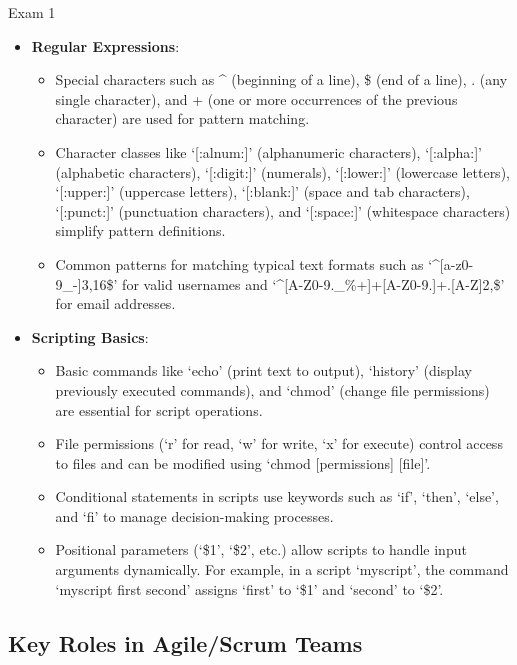 \begin{examnotes}{Exam 1}
\begin{highlight}
        \begin{itemize}
            \item \textbf{Regular Expressions}:
                \begin{itemize}
                    \item Special characters such as \^{} (beginning of a line), \$ (end of a line), . (any single character), and + (one or more occurrences of the previous character) are used for pattern matching.
                    \item Character classes like `[:alnum:]' (alphanumeric characters), `[:alpha:]' (alphabetic characters), `[:digit:]' (numerals), `[:lower:]' (lowercase letters), `[:upper:]' 
                    (uppercase letters), `[:blank:]' (space and tab characters), `[:punct:]' (punctuation characters), and `[:space:]' (whitespace characters) simplify pattern definitions.
                    \item Common patterns for matching typical text formats such as `\^{}[a-z0-9\_-]{3,16}\$' for valid usernames and `\^{}[A-Z0-9.\_\%+\-]+\@[A-Z0-9.\-]+.[A-Z]{2,}\$' for email addresses.
                \end{itemize}
            \item \textbf{Scripting Basics}:
                \begin{itemize}
                    \item Basic commands like `echo' (print text to output), `history' (display previously executed commands), and `chmod' (change file permissions) are essential for script operations.
                    \item File permissions (`r' for read, `w' for write, `x' for execute) control access to files and can be modified using `chmod [permissions] [file]'.
                    \item Conditional statements in scripts use keywords such as `if', `then', `else', and `fi' to manage decision-making processes.
                    \item Positional parameters (`\$1', `\$2', etc.) allow scripts to handle input arguments dynamically. For example, in a script `myscript', the command `myscript first second' assigns `first' to `\$1' and `second' to `\$2'.
                \end{itemize}
        \end{itemize}
    \end{highlight}
    
    \subsection*{Key Roles in Agile/Scrum Teams}
    

\end{examnotes}
